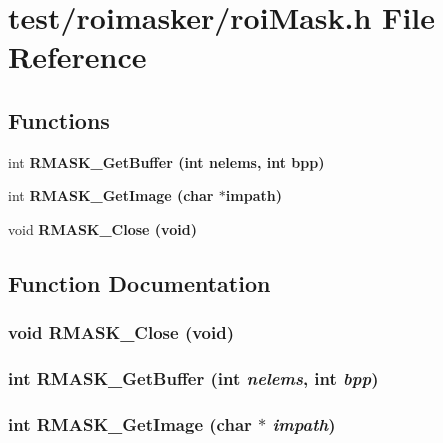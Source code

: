 \section{test/roimasker/roi\-Mask.h File Reference}
\label{roiMask_8h}
\subsection*{Functions}
\begin{CompactItemize}
\item 
int \bf{RMASK\_\-Get\-Buffer} (int nelems, int bpp)
\item 
int \bf{RMASK\_\-Get\-Image} (char $\ast$impath)
\item 
void \bf{RMASK\_\-Close} (void)
\end{CompactItemize}


\subsection{Function Documentation}
\subsubsection{\setlength{\rightskip}{0pt plus 5cm}void RMASK\_\-Close (void)}\label{roiMask_8h_743ca7bc8cf46db890ba6e12e0210a5f}


\subsubsection{\setlength{\rightskip}{0pt plus 5cm}int RMASK\_\-Get\-Buffer (int {\em nelems}, int {\em bpp})}\label{roiMask_8h_df9f9b929e3cb655e76b15ab54846410}


\subsubsection{\setlength{\rightskip}{0pt plus 5cm}int RMASK\_\-Get\-Image (char $\ast$ {\em impath})}\label{roiMask_8h_0ddbf38deb94dfc84ff9f440b7e8a90f}


